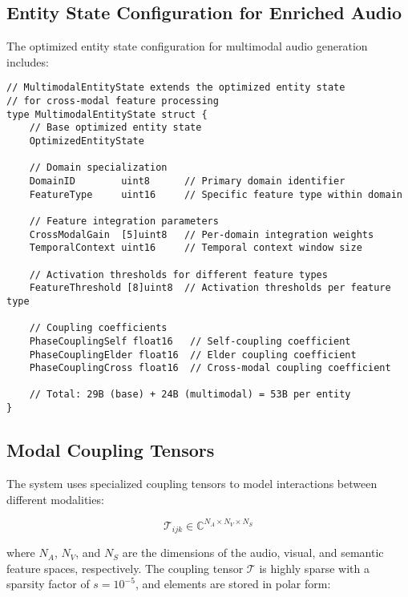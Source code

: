 \subsection{Entity State Configuration for Enriched Audio}

The optimized entity state configuration for multimodal audio generation includes:

\begin{tcolorbox}[colback=CodeBackground, colframe=DarkGray, title=Extended Entity State for Multimodal Processing, fonttitle=\bfseries]
\begin{verbatim}
// MultimodalEntityState extends the optimized entity state
// for cross-modal feature processing
type MultimodalEntityState struct {
    // Base optimized entity state
    OptimizedEntityState
    
    // Domain specialization
    DomainID        uint8      // Primary domain identifier
    FeatureType     uint16     // Specific feature type within domain
    
    // Feature integration parameters
    CrossModalGain  [5]uint8   // Per-domain integration weights
    TemporalContext uint16     // Temporal context window size
    
    // Activation thresholds for different feature types
    FeatureThreshold [8]uint8  // Activation thresholds per feature type
    
    // Coupling coefficients
    PhaseCouplingSelf float16   // Self-coupling coefficient
    PhaseCouplingElder float16  // Elder coupling coefficient
    PhaseCouplingCross float16  // Cross-modal coupling coefficient
    
    // Total: 29B (base) + 24B (multimodal) = 53B per entity
}
\end{verbatim}
\end{tcolorbox}

\subsection{Modal Coupling Tensors}

The system uses specialized coupling tensors to model interactions between different modalities:

\begin{equation}
\mathcal{T}_{ijk} \in \mathbb{C}^{N_A \times N_V \times N_S}
\end{equation}

where $N_A$, $N_V$, and $N_S$ are the dimensions of the audio, visual, and semantic feature spaces, respectively. The coupling tensor $\mathcal{T}$ is highly sparse with a sparsity factor of $s = 10^{-5}$, and elements are stored in polar form:

